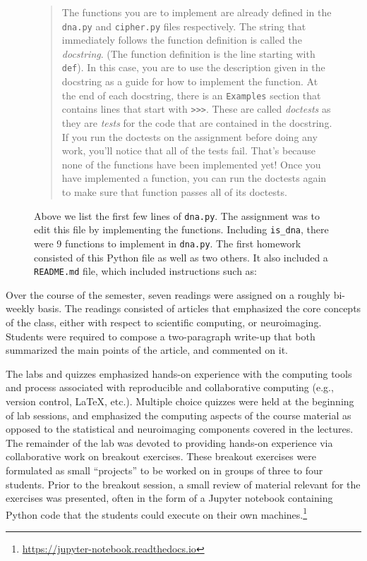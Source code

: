 \begin{figure}
\centering

\caption{Above we list the first few lines of \texttt{dna.py}.
The assignment was to edit this file by implementing the functions.
Including \texttt{is\_dna}, there were 9 functions
to implement in \texttt{dna.py}.
The first homework consisted of this Python file as well as two others.
It also included a \texttt{README.md} file, which included instructions
such as:}\label{fig:dna}
\begin{quotation}
The functions you are to implement are already defined in the \texttt{dna.py} and
\texttt{cipher.py} files respectively. The string that immediately follows the function
definition is called the \emph{docstring}. (The function definition is the line
starting with \texttt{def}). In this case, you are to use the description given in the
docstring as a guide for how to implement the function. At the end of each
docstring, there is an \texttt{Examples} section that contains lines that start with
\verb|>>>|. These are called \emph{doctests} as they are \emph{tests} for the code that are
contained in the docstring. If you run the doctests on the assignment before
doing any work, you'll notice that all of the tests fail. That's because none
of the functions have been implemented yet! Once you have implemented a
function, you can run the doctests again to make sure that function passes all
of its doctests.
\end{quotation}
\end{figure}

Over the course of the semester, seven readings were assigned on a roughly
bi-weekly basis.
The readings consisted of articles that emphasized the core concepts
of the class, either with respect to scientific computing, or neuroimaging.
Students were required to compose a two-paragraph write-up that both summarized
the main points of the article, and commented on it.

The labs and quizzes emphasized hands-on experience with the computing tools
and process associated with reproducible and collaborative computing (e.g.,
version control, \LaTeX, etc.).
Multiple choice quizzes were held at the beginning of lab sessions, and
emphasized the computing aspects of the course material as
opposed to the statistical and neuroimaging components covered in the lectures.
The remainder of the lab was devoted to providing hands-on experience via
collaborative work on breakout exercises.
These breakout exercises were formulated as small ``projects'' to be worked on
in groups of three to four students.
Prior to the breakout session, a small review of material relevant for the
exercises was presented, often in the form of a Jupyter notebook containing
Python code that the students could execute on their own
machines.\footnote{\url{https://jupyter-notebook.readthedocs.io}}

